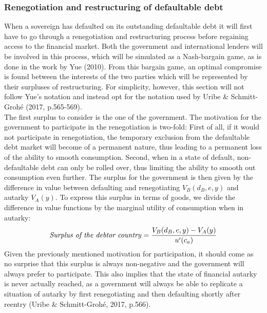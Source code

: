 \subsubsection{Renegotiation and restructuring of defaultable debt}
When a sovereign has defaulted on its outstanding defaultable debt it will first have to go through a renegotiation and restructuring process before regaining access to the financial market. Both the government and international lenders will be involved in this process, which will be simulated as a Nash-bargain game, as is done in the work by Yue (2010). From this bargain game, an optimal compromise is found between the interests of the two parties which will be represented by their surpluses of restructuring. For simplicity, however, this section will not follow Yue's notation and instead opt for the notation used by Uribe \& Schmitt-Grohé (2017, p.565-569).\\

The first surplus to consider is the one of the government. The motivation for the government to participate in the renegotiation is two-fold: First of all, if it would not participate in renegotiation, the temporary exclusion from the defaultable debt market will become of a permanent nature, thus leading to a permanent loss of the ability to smooth consumption. Second, when in a state of default, non-defaultable debt can only be rolled over, thus limiting the ability to smooth out consumption even further. The surplus for the government is then given by the difference in value between defaulting and renegotiating $V_B(d_B,e,y)$ and autarky $V_A(y)$. To express this surplus in terms of goods, we divide the difference in value functions by the marginal utility of consumption when in autarky:
\begin{equation*}
    \text{\textit{Surplus of the debtor country}} = \frac{V_B(d_B,e,y)-V_A(y)}{u'(c_a)}
\end{equation*}
Given the previously mentioned motivation for participation, it should come as no surprise that this surplus is always non-negative and the government will always prefer to participate. This also implies that the state of financial autarky is never actually reached, as a government will always be able to replicate a situation of autarky by first renegotiating and then defaulting shortly after reentry (Uribe \& Schmitt-Grohé, 2017, p.566).\\

